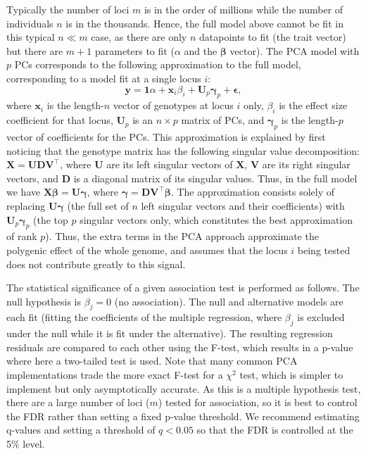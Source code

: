 \documentclass[12pt]{article}
\begin{document}
Typically the number of loci $m$ is in the order of millions while the number of individuals $n$ is in the thousands.
Hence, the full model above cannot be fit in this typical $n \ll m$ case, as there are only $n$ datapoints to fit (the trait vector) but there are $m+1$ parameters to fit ($\alpha$ and the $\mathbf{\beta}$ vector).
The PCA model with $p$ PCs corresponds to the following approximation to the full model, corresponding to a model fit at a single locus $i$:
\begin{equation}
  \label{eq:pca_gwas}
  \mathbf{y}
  =
  \mathbf{1} \alpha + \mathbf{x}_i \beta_i + \mathbf{U}_p \mathbf{\gamma}_p + \mathbf{\epsilon}
  ,
\end{equation}
where $\mathbf{x}_i$ is the length-$n$ vector of genotypes at locus $i$ only,
$\beta_i$ is the effect size coefficient for that locus,
$\mathbf{U}_p$ is an $n \times p$ matrix of PCs, and
$\mathbf{\gamma}_p$ is the length-$p$ vector of coefficients for the PCs.
This approximation is explained by first noticing that the genotype matrix has the following singular value decomposition:
$\mathbf{X} = \mathbf{U} \mathbf{D} \mathbf{V}^\intercal$,
where
$\mathbf{U}$ are its left singular vectors of $\mathbf{X}$,
$\mathbf{V}$ are its right singular vectors, and
$\mathbf{D}$ is a diagonal matrix of its singular values.
Thus, in the full model we have
$\mathbf{X} \mathbf{\beta} = \mathbf{U} \mathbf{\gamma}$,
where
$\mathbf{\gamma} = \mathbf{D} \mathbf{V}^\intercal \mathbf{\beta}$.
The approximation consists solely of replacing $\mathbf{U} \mathbf{\gamma}$ (the full set of $n$ left singular vectors and their coefficients) with $\mathbf{U}_p \mathbf{\gamma}_p$ (the top $p$ singular vectors only, which constitutes the best approximation of rank $p$).
Thus, the extra terms in the PCA approach approximate the polygenic effect of the whole genome, and assumes that the locus $i$ being tested does not contribute greatly to this signal.

The statistical significance of a given association test is performed as follows.
The null hypothesis is $\beta_j = 0$ (no association).
The null and alternative models are each fit (fitting the coefficients of the multiple regression, where $\beta_j$ is excluded under the null while it is fit under the alternative).
The resulting regression residuals are compared to each other using the F-test, which results in a p-value where here a two-tailed test is used.
Note that many common PCA implementations trade the more exact F-test for a $\chi^2$ test, which is simpler to implement but only asymptotically accurate.
As this is a multiple hypothesis test, there are a large number of loci ($m$) tested for association, so it is best to control the FDR rather than setting a fixed p-value threshold.
We recommend estimating q-values and setting a threshold of $q < 0.05$ so that the FDR is controlled at the 5\% level.
\end{document}
